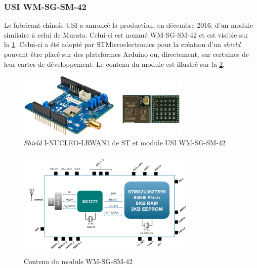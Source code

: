 \FloatBarrier
\subsubsection{USI WM-SG-SM-42}

Le fabricant chinois USI a annoncé la production, en décembre 2016, d'un module similaire à celui de Murata. Celui-ci est nommé WM-SG-SM-42 et est visible sur la \cref{fig-usi_en.i-nucleo-lrwan1}. Celui-ci a été adopté par STMicroelectronics pour la création d'un \textit{shield} pouvant être placé sur des plateformes Arduino ou, directement, sur certaines de leur cartes de développement. Le contenu du module est illustré sur la \cref{fig-usi_bloc_diagram}.\\


\begin{figure}[ht!]
    \centering
    \includegraphics[width=0.75\textwidth]{Figures/Hardware/usi_i-nucleo-lrwan1.jpg}
    \caption{\textit{Shield} I-NUCLEO-LRWAN1 de ST et module USI WM-SG-SM-42}
    \label{fig-usi_en.i-nucleo-lrwan1}
\end{figure}

\begin{figure}[ht!]
    \centering
    \includegraphics[width=0.8\textwidth]{Figures/Hardware/usi_bloc_diagram.PNG}
    \caption{Contenu du module WM-SG-SM-42}
    \label{fig-usi_bloc_diagram}
\end{figure}

